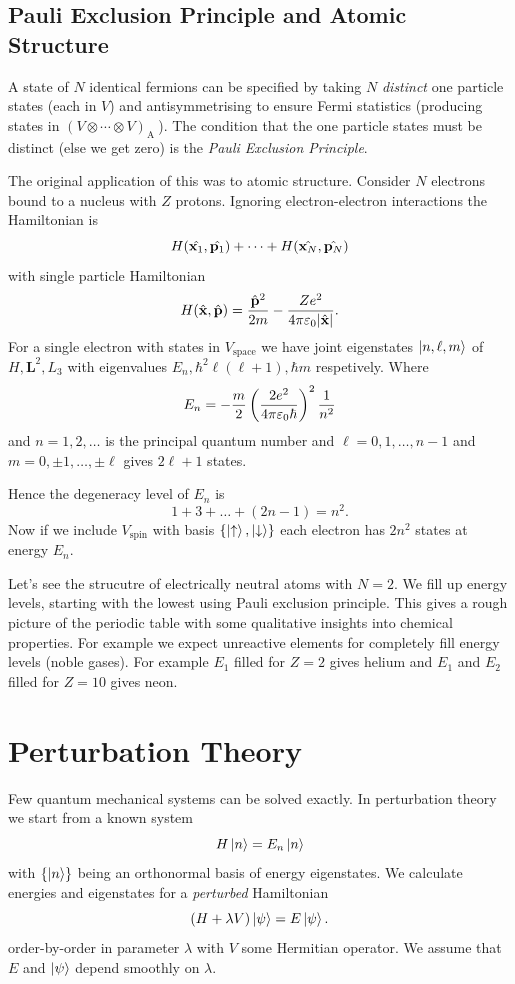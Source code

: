 \documentclass{article}
\begin{document}
\subsection{Pauli Exclusion Principle and Atomic Structure}
A state of $ N $ identical fermions can be specified by taking $ N $ \textit{distinct} one particle states (each in $ V $) and antisymmetrising to ensure Fermi statistics (producing states in $ (V\otimes \cdots \otimes V)_{\mathrm A} \ $). The condition that the one particle states must be distinct (else we get zero) is the \textit{Pauli Exclusion Principle}.\par
The original application of this was to atomic structure. Consider $ N $ electrons bound to a nucleus with $ Z $ protons. Ignoring electron-electron interactions the Hamiltonian is 
\[
	H(\hat {\mathbf{x}_1},\hat{\mathbf p_1}) + \cdots + H(\hat{\mathbf{x}_N},\hat{\mathbf p_N})
\]
with single particle Hamiltonian
\[
	H(\hat {\mathbf{x}}, \hat{\mathbf p}) = \frac {\hat{\mathbf p}^2}{2m} - \frac {Z e^2}{4\pi \varepsilon_0 |\hat{\mathbf x}|}.
\]
For a single electron with states in $ V_{\mathrm{space}} $ we have joint eigenstates $ \ket{n, \ell, m} $ of $ H,\mathbf L^2, L_3 $ with eigenvalues $ E_n, \hbar^2\ell(\ell+1), \hbar m $ respetively. Where
\[
	E_n = -\frac m2 \left(\frac{2e^2}{4\pi \varepsilon_0\hbar}\right)^2 \frac 1{n^2}
\]
and $ n=1,2,\dots $ is the principal quantum number and $ \ell = 0,1, \dots, n-1 $ and $ m = 0, \pm 1, \dots, \pm \ell $ gives $ 2\ell + 1 $ states.\par
Hence the degeneracy level of $ E_n $ is
\[
  1 + 3 + \dots + (2n-1) = n^2.
\]
Now if we include $ V_{\mathrm{spin}} $ with basis $ \{\ket \uparrow, \ket \downarrow\} $ each electron has $ 2n^2 $ states at energy $ E_n $.\par
Let's see the strucutre of electrically neutral atoms with $ N=2 $. We fill up energy levels, starting with the lowest using Pauli exclusion principle. This gives a rough picture of the periodic table with some qualitative insights into chemical properties. For example we expect unreactive elements for completely fill energy levels (noble gases). For example $ E_1 $ filled for $ Z=2 $ gives helium and $ E_1 $ and $ E_2 $ filled for $ Z=10 $ gives neon.
\section{Perturbation Theory}
Few quantum mechanical systems can be solved exactly. In perturbation theory we start from a known system
\[
  H\ket n = E_n\ket n
\]
with $ \{\ket n\} $ being an orthonormal basis of energy eigenstates. We calculate energies and eigenstates for a \textit{perturbed} Hamiltonian
\[
	(H+ \lambda V)\ket \psi = E\ket \psi.
\]
order-by-order in parameter $ \lambda $ with $ V $ some Hermitian operator. We assume that $ E $ and $ \ket\psi $ depend smoothly on $ \lambda $.
\end{document}
